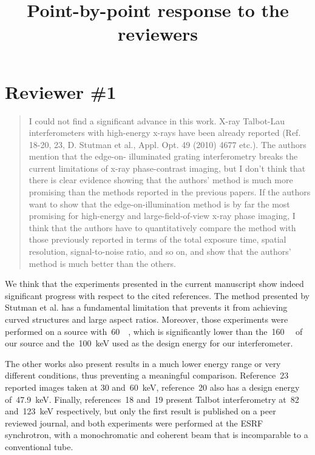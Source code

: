 \documentclass[a4paper,english]{scrartcl}
\title{Point-by-point response to the reviewers}
\date{}
\begin{document}
\maketitle

\section*{Reviewer \#1}
\begin{quote}
    I could not find a significant advance in this work. X-ray Talbot-Lau
    interferometers with high-energy x-rays have been already reported (Ref.
    18-20, 23, D. Stutman et al., Appl. Opt. 49 (2010) 4677 etc.). The
    authors mention that the edge-on- illuminated grating interferometry
    breaks the current limitations of x-ray phase-contrast imaging, but I
    don't think that there is clear evidence showing that the authors'
    method is much more promising than the methods reported in the previous
    papers. If the authors want to show that the edge-on-illumination method
    is by far the most promising for high-energy and large-field-of-view
    x-ray phase imaging, I think that the authors have to quantitatively
    compare the method with those previously reported in terms of the total
    exposure time, spatial resolution, signal-to-noise ratio, and so on, and
    show that the authors' method is much better than the others.
\end{quote}
We think that the experiments presented in the current manuscript show
indeed significant progress with respect to the cited references.
The method presented by Stutman et al. has a fundamental limitation that
prevents it from achieving curved structures and large aspect ratios.
Moreover, those experiments were performed on a source
with~\SI{60}{\kilo\voltpeak}, which is significantly lower than
the~\SI{160}{\kilo\voltpeak} of our source and the~\SI{100}{\kilo\eV} used
as the design energy for our interferometer.

The other works also present results in a much lower energy range or very
different conditions, thus preventing a meaningful comparison.
Reference~23 reported images taken at \num{30} and~\SI{60}{\kilo\eV},
reference~20 also has a design energy of~\SI{47.9}{\kilo\eV}. Finally,
references~18 and~19 present Talbot interferometry at~\num{82}
and~\SI{123}{\kilo\eV} respectively, but only the first result is published
on a peer reviewed journal, and both experiments were performed at the ESRF
synchrotron, with a monochromatic and coherent beam that is incomparable to
a conventional tube.
\end{document}
